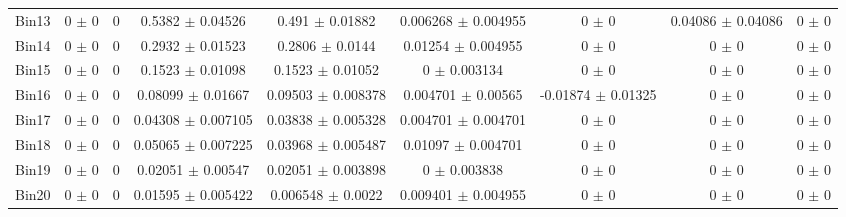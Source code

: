 \begin{tabular}{@{\extracolsep{4pt}}lcccccccc@{}}
     Bin13 & 0 $\pm$ 0 & 0 & 0.5382 $\pm$ 0.04526 & 0.491 $\pm$ 0.01882 & 0.006268 $\pm$ 0.004955 & 0 $\pm$ 0 & 0.04086 $\pm$ 0.04086 & 0 $\pm$ 0 \\ 
     Bin14 & 0 $\pm$ 0 & 0 & 0.2932 $\pm$ 0.01523 & 0.2806 $\pm$ 0.0144 & 0.01254 $\pm$ 0.004955 & 0 $\pm$ 0 & 0 $\pm$ 0 & 0 $\pm$ 0 \\ 
     Bin15 & 0 $\pm$ 0 & 0 & 0.1523 $\pm$ 0.01098 & 0.1523 $\pm$ 0.01052 & 0 $\pm$ 0.003134 & 0 $\pm$ 0 & 0 $\pm$ 0 & 0 $\pm$ 0 \\ 
     Bin16 & 0 $\pm$ 0 & 0 & 0.08099 $\pm$ 0.01667 & 0.09503 $\pm$ 0.008378 & 0.004701 $\pm$ 0.00565 & -0.01874 $\pm$ 0.01325 & 0 $\pm$ 0 & 0 $\pm$ 0 \\ 
     Bin17 & 0 $\pm$ 0 & 0 & 0.04308 $\pm$ 0.007105 & 0.03838 $\pm$ 0.005328 & 0.004701 $\pm$ 0.004701 & 0 $\pm$ 0 & 0 $\pm$ 0 & 0 $\pm$ 0 \\ 
     Bin18 & 0 $\pm$ 0 & 0 & 0.05065 $\pm$ 0.007225 & 0.03968 $\pm$ 0.005487 & 0.01097 $\pm$ 0.004701 & 0 $\pm$ 0 & 0 $\pm$ 0 & 0 $\pm$ 0 \\ 
     Bin19 & 0 $\pm$ 0 & 0 & 0.02051 $\pm$ 0.00547 & 0.02051 $\pm$ 0.003898 & 0 $\pm$ 0.003838 & 0 $\pm$ 0 & 0 $\pm$ 0 & 0 $\pm$ 0 \\ 
     Bin20 & 0 $\pm$ 0 & 0 & 0.01595 $\pm$ 0.005422 & 0.006548 $\pm$ 0.0022 & 0.009401 $\pm$ 0.004955 & 0 $\pm$ 0 & 0 $\pm$ 0 & 0 $\pm$ 0 \\ 
\hline\hline
  \end{tabular}
